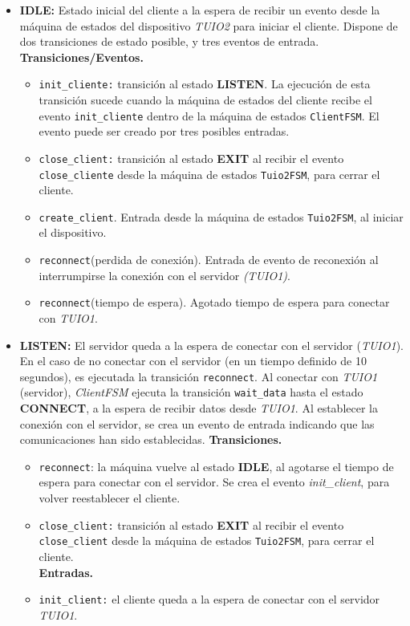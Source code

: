 \begin{itemize}
\item \textbf{IDLE:} Estado inicial del cliente a la espera de recibir un evento desde la máquina de estados del dispositivo \emph{TUIO2} para iniciar el cliente. Dispone de dos transiciones de estado posible, y tres eventos de entrada.\\
\textbf{Transiciones/Eventos.}
\begin{itemize}
\item \texttt{init\_cliente:} transición al estado \textbf{LISTEN}. La ejecución de esta transición sucede cuando la máquina de estados del cliente recibe el evento \texttt{init\_cliente} dentro de la máquina de estados \texttt{ClientFSM}. El evento puede ser creado por tres posibles entradas.
\item \texttt{close\_client:} transición al estado \textbf{EXIT} al recibir el evento \texttt{close\_cliente} desde la máquina de estados \texttt{Tuio2FSM}, para cerrar el cliente.\\
\item \texttt{create\_client}. Entrada desde la máquina de estados \texttt{Tuio2FSM}, al iniciar el dispositivo.
\item \texttt{reconnect}(perdida de conexión). Entrada de evento de reconexión al interrumpirse la conexión con el servidor \emph{(TUIO1)}.
\item \texttt{reconnect}(tiempo de espera). Agotado tiempo de espera para conectar con \emph{TUIO1}.
\end{itemize}


\item \textbf{LISTEN:} El servidor queda a la espera de conectar con el servidor (\emph{TUIO1}). En el caso de no conectar con el servidor (en un tiempo definido de 10 segundos), es ejecutada la transición \texttt{reconnect}. 
Al conectar con \emph{TUIO1} (servidor), \emph{ClientFSM} ejecuta la transición \texttt{wait\_data} hasta el estado \textbf{CONNECT}, a la espera de recibir datos desde \emph{TUIO1}. Al establecer la conexión con el servidor, se crea un evento de entrada indicando que las comunicaciones han sido establecidas.
\textbf{Transiciones.}
\begin{itemize}
\item \texttt{reconnect}: la máquina vuelve al estado \textbf{IDLE}, al agotarse el tiempo de espera para conectar con el servidor. Se crea el evento \emph{init\_client}, para volver reestablecer el cliente.\\
\item \texttt{close\_client:} transición al estado \textbf{EXIT} al recibir el evento \texttt{close\_client} desde la máquina de estados \texttt{Tuio2FSM}, para cerrar el cliente.\\
\textbf{Entradas.}
\item \texttt{init\_client:} el cliente queda a la espera de conectar con el servidor \emph{TUIO1}.
\end{itemize}



\end{itemize}
